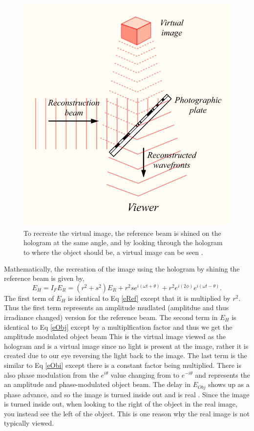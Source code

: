 \documentclass[ notitlepage, numerical, 11pt]{revtex4-1} %
\begin{document}
\begin{figure}[H]
\centerline{\includegraphics[scale=.45]{reconstruct.png}}
\caption{To recreate the virtual image, the reference beam is shined on the hologram at the same angle, and by looking through the hologram to where the object should be, a virtual image can be seen \cite{wikiHolo}.}
\label{reconstruct}
\end{figure} 
Mathematically, the recreation of the image using the hologram by shining the reference beam is given by,
\begin{equation}
E_H =  I_F E_R = (r^2 +s ^2)E_R + r^2se^{i(\omega t +\theta)} + r^2e^{i(2\phi)}e^{i(\omega t-\theta)}.
\label{Eh}
\end{equation}
The first term of $E_H$ is identical to Eq \ref{eRef} except that it is multiplied by $r^2$. Thus the first term represents an amplitude mudlated (amplitdue and  thus irradiance changed) version for the reference beam. The second term in $E_H$ is identical to Eq \ref{eObj} except by a multiplfication factor and thus we get the amplitude modulated object beam This is the virtual image viewed as the hologram and is a virtual image since no light is present at the image, rather it is created due to our eye reversing the light back to the image. The last term is the similar to Eq \ref{eObi} except there is a constant factor being multiplied. There is also phase modulation from the $e^{i\theta}$ value changing from to $e^{-i\theta}$ and represents the an amplitude and phase-modulated object beam. The delay in $E_{Obj}$ shows up as a phase advance, and so the image is turned inside out and is real \cite{optics}. Since the image is turned inside out, when looking to the right of the object in the real image, you instead see the left of the object. This is one reason why the real image is not typically viewed.
\end{document}
